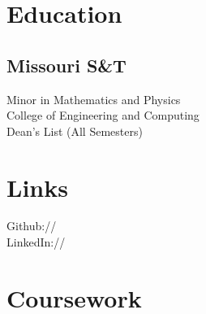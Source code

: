 \documentclass[]{deedy-resume-openfont}
\begin{document}
%
%
\lastupdated

%
%



%
%

\begin{minipage}[t]{0.33\textwidth} 


\section{Education} 

\subsection{Missouri S\&T}
Minor in Mathematics and Physics \\
College of Engineering and Computing \\
Dean's List (All Semesters) \\
\sectionsep


\section{Links} 
Github:// \href{https://github.com/andrewvh4}{} \\
LinkedIn://  \href{https://www.linkedin.com/in/andrewvanhorn/}{} \\
\sectionsep


\section{Coursework}


\end{minipage}
\end{document}
